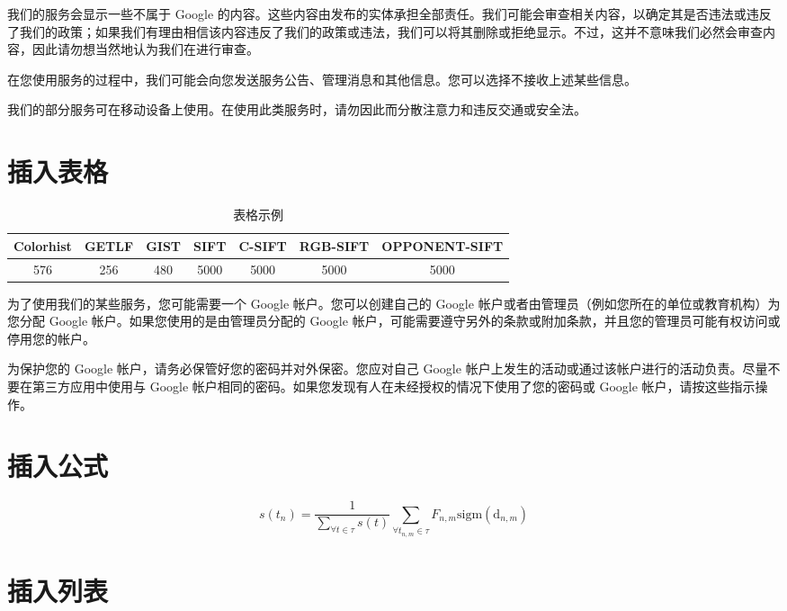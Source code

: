 我们的服务会显示一些不属于 Google 的内容。这些内容由发布的实体承担全部责任。我们可能会审查相关内容，以确定其是否违法或违反了我们的政策；如果我们有理由相信该内容违反了我们的政策或违法，我们可以将其删除或拒绝显示。不过，这并不意味我们必然会审查内容，因此请勿想当然地认为我们在进行审查。

在您使用服务的过程中，我们可能会向您发送服务公告、管理消息和其他信息。您可以选择不接收上述某些信息。

我们的部分服务可在移动设备上使用。在使用此类服务时，请勿因此而分散注意力和违反交通或安全法。

\section{插入表格}

\begin{table}[htbp]
\centering
\caption{表格示例}\label{TABfeatures}
\begin{tabular}
{ccccccc}
\toprule
Colorhist& GETLF& GIST& SIFT& C-SIFT& RGB-SIFT& OPPONENT-SIFT\\
\hline
576& 256& 480& 5000& 5000& 5000& 5000\\
\bottomrule
\end{tabular}
\end{table}

为了使用我们的某些服务，您可能需要一个 Google 帐户。您可以创建自己的 Google 帐户或者由管理员（例如您所在的单位或教育机构）为您分配 Google 帐户。如果您使用的是由管理员分配的 Google 帐户，可能需要遵守另外的条款或附加条款，并且您的管理员可能有权访问或停用您的帐户。

为保护您的 Google 帐户，请务必保管好您的密码并对外保密。您应对自己 Google 帐户上发生的活动或通过该帐户进行的活动负责。尽量不要在第三方应用中使用与 Google 帐户相同的密码。如果您发现有人在未经授权的情况下使用了您的密码或 Google 帐户，请按这些指示操作。

\section{插入公式}

\begin{equation}\label{EQKeywordWeight}
s(t_n) = \frac{1}{\sum_{\forall t\in\tau}s(t)} \sum_{\forall t_{n,m}\in\tau}F_{n,m}\mathrm{sigm}(\mathrm{d}_{n,m})
\end{equation}

\section{插入列表}

